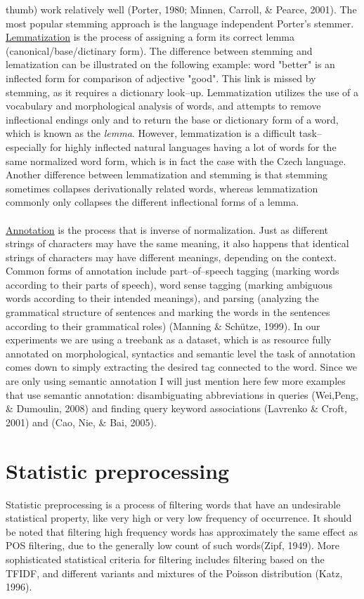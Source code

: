 thumb) work relatively well (Porter, 1980; Minnen, Carroll, \& Pearce, 2001). The most 
popular stemming approach is the language independent Porter's stemmer.  \underline{Lemmatization} is 
the process of assigning a form its correct lemma (canonical/base/dictinary form). The difference between stemming and lematization can be illustrated on the following 
example: word "better" is an inflected form for comparison of adjective  "good".  
This link is missed by stemming, as it requires a 
dictionary look--up. Lemmatization utilizes the use of a vocabulary and morphological analysis of words, 
and attempts to remove inflectional endings only and to return the base or dictionary form of a word, 
which is known as the \textit{lemma}. However, lemmatization is a difficult task-- especially for highly 
inflected natural languages having a lot of words for the same normalized word form, which is in fact the 
case with the Czech language. Another difference between lemmatization and stemming is that stemming 
sometimes collapses derivationally related words, whereas lemmatization commonly only collapses 
the different inflectional forms of a lemma.
\\\\  \underline{Annotation} is the process that is inverse of normalization. Just as different strings of 
characters may have the same meaning, it also happens that identical strings of characters may have 
different meanings, depending on the context. Common forms of annotation include part--of--speech 
tagging (marking words according to their parts of speech), word sense tagging (marking ambiguous 
words according to their intended meanings), and parsing (analyzing the grammatical structure of 
sentences and marking the words in the sentences according to their grammatical roles) (Manning \& 
Sch\"utze, 1999).  In our experiments we are using a treebank  as a 
dataset, which is as resource fully annotated on morphological, syntactics and semantic level the task of 
annotation comes down to simply extracting the desired tag connected to the word. Since we are only 
using semantic annotation I will just mention here few more examples that use semantic annotation: 
disambiguating abbreviations in queries (Wei,Peng, \& Dumoulin, 2008) and finding 
query keyword associations (Lavrenko \& Croft, 2001) and  (Cao, Nie, \& Bai, 
2005).

\section{Statistic preprocessing}
Statistic preprocessing is a process of filtering words that have an undesirable statistical property, like very high or very low frequency of occurrence. It should be noted that filtering high frequency words has approximately the same effect as POS filtering, due to the generally low count of such words(Zipf, 1949). More sophisticated statistical criteria for filtering includes filtering based on the TFIDF, and different variants and mixtures of the Poisson distribution (Katz, 1996).

